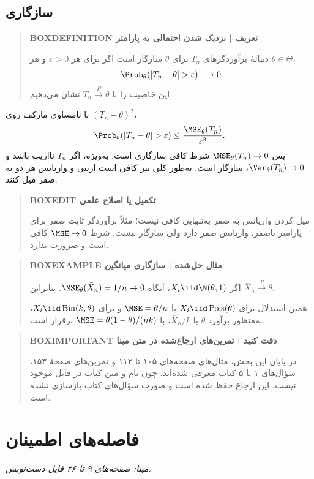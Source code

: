 \section{سازگاری}
\begin{quote}\textbf{BOXDEFINITION تعریف | نزدیک شدن احتمالی به پارامتر}\par 
دنبالهٔ برآوردگرهای $T_n$ برای $\theta$ سازگار است اگر برای هر $\varepsilon>0$ و هر $\theta\in\Theta$،
\[
\Prob_\theta(|T_n-\theta|>\varepsilon)\longrightarrow0.
\]
این خاصیت را با $T_n\xrightarrow{P}\theta$ نشان می‌دهیم.
\end{quote}
با نامساوی مارکف روی $(T_n-\theta)^2$،
\[
\Prob_\theta(|T_n-\theta|>\varepsilon)
\le\frac{\MSE_\theta(T_n)}{\varepsilon^2}.
\]
پس $\MSE_\theta(T_n)\to0$ شرط کافی سازگاری است. به‌ویژه، اگر $T_n$ نااریب باشد و $\Var_\theta(T_n)\to0$، سازگار است. به‌طور کلی نیز کافی است اریبی و واریانس هر دو به صفر میل کنند.
\begin{quote}\textbf{BOXEDIT تکمیل یا اصلاح علمی}\par میل کردن واریانس به صفر به‌تنهایی کافی نیست؛ مثلاً برآوردگر ثابت صفر برای پارامتر ناصفر، واریانس صفر دارد ولی سازگار نیست. شرط $\MSE\to0$ کافی است و ضرورت ندارد.\end{quote}
\begin{quote}\textbf{BOXEXAMPLE مثال حل‌شده | سازگاری میانگین}\par 
اگر $X_i\iid\N(\theta,1)$، آنگاه $\MSE_\theta(\bar X_n)=1/n\to0$. بنابراین $\bar X_n\xrightarrow{P}\theta$.

همین استدلال برای $X_i\iid\operatorname{Pois}(\theta)$ با $\MSE=\theta/n$ و برای $X_i\iid\operatorname{Bin}(k,\theta)$، به‌منظور برآورد $\theta$ با $\bar X_n/k$، با $\MSE=\theta(1-\theta)/(nk)$ برقرار است.
\end{quote}
\begin{quote}\textbf{BOXIMPORTANT دقت کنید | تمرین‌های ارجاع‌شده در متن مبنا}\par 
در پایان این بخش، مثال‌های صفحه‌های ۱۰۵ تا ۱۱۲ و تمرین‌های صفحهٔ ۱۵۳، سؤال‌های ۱ تا ۵ کتاب معرفی شده‌اند. چون نام و متن کتاب در فایل موجود نیست، این ارجاع حفظ شده است و صورت سؤال‌های کتاب بازسازی نشده است.
\end{quote}

\chapter{فاصله‌های اطمینان}
\textit{مبنا: صفحه‌های ۹ تا ۲۶ فایل دست‌نویس.}\par 
